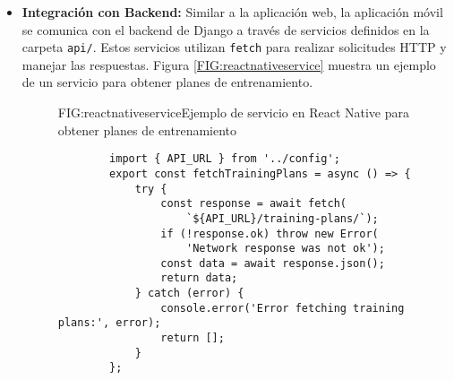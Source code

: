 \begin{itemize}
    \item \textbf{Integración con Backend:} Similar a la aplicación web, la aplicación móvil se comunica con el backend de Django a través de servicios definidos en la carpeta \texttt{api/}. Estos servicios utilizan \texttt{fetch} para realizar solicitudes HTTP y manejar las respuestas. Figura \ref{FIG:reactnativeservice} muestra un ejemplo de un servicio para obtener planes de entrenamiento.
    \begin{figure}[Ejemplo Servicio React Native]{FIG:reactnativeservice}{Ejemplo de servicio en React Native para obtener planes de entrenamiento}
    \begin{verbatim}
        import { API_URL } from '../config';
        export const fetchTrainingPlans = async () => {
            try {
                const response = await fetch(
                    `${API_URL}/training-plans/`);
                if (!response.ok) throw new Error(
                    'Network response was not ok');
                const data = await response.json();
                return data;
            } catch (error) {
                console.error('Error fetching training plans:', error);
                return [];
            }
        };
    \end{verbatim}
    \end{figure}

\end{itemize}
